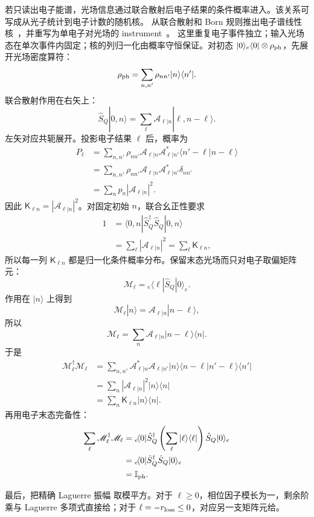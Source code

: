 \begin{exbox}
若只读出电子能谱，光场信息通过联合散射后电子结果的条件概率进入。该关系可写成从光子统计到电子计数的随机核。 从联合散射和 Born 规则推出电子谱线性核~，并重写为单电子对光场的 instrument~。 这里重复电子事件独立；输入光场态在单次事件内固定；核的列归一化由概率守恒保证。对初态 $|0\rangle_e\langle0|\otimes\rho_{\rm ph}$，先展开光场密度算符：
\[
\rho_{\rm ph}=\sum_{n,n'}\rho_{nn'}|n\rangle\langle n'|.
\]
联合散射作用在右矢上：
\[
\hat S_Q|0,n\rangle
=\sum_\ell\mathcal A_{\ell|n}|\ell,n-\ell\rangle.
\]
左矢对应共轭展开。投影电子结果 $\ell$ 后，概率为
\begin{align*}
P_\ell
&=\sum_{n,n'}\rho_{nn'}
\mathcal A_{\ell|n}\mathcal A_{\ell|n'}^*
\langle n'-\ell|n-\ell\rangle\\
&=\sum_{n,n'}\rho_{nn'}
\mathcal A_{\ell|n}\mathcal A_{\ell|n'}^*\delta_{nn'}\\
&=\sum_n p_n|\mathcal A_{\ell|n}|^2.
\end{align*}
因此 $\mathsf K_{\ell n}=|\mathcal A_{\ell|n}|^2$。对固定初始 $n$，联合幺正性要求
\begin{align*}
1
&=\langle0,n|\hat S_Q^\dagger\hat S_Q|0,n\rangle\\
&=\sum_\ell|\mathcal A_{\ell|n}|^2
=\sum_\ell\mathsf K_{\ell n},
\end{align*}
所以每一列 $\mathsf K_{\ell n}$ 都是归一化条件概率分布。保留末态光场而只对电子取偏矩阵元：
\[
\mathscr M_\ell
={}_e\!\langle\ell|\hat S_Q|0\rangle_e.
\]
作用在 $|n\rangle$ 上得到
\[
\mathscr M_\ell|n\rangle
=\mathcal A_{\ell|n}|n-\ell\rangle,
\]
所以
\[
\mathscr M_\ell
=\sum_n\mathcal A_{\ell|n}|n-\ell\rangle\langle n|.
\]
于是
\begin{align*}
\mathscr M_\ell^\dagger\mathscr M_\ell
&=\sum_{n,n'}
\mathcal A_{\ell|n}^*\mathcal A_{\ell|n'}
|n\rangle\langle n-\ell|n'-\ell\rangle\langle n'|\\
&=\sum_n|\mathcal A_{\ell|n}|^2|n\rangle\langle n|\\
&=\sum_n\mathsf K_{\ell n}|n\rangle\langle n|.
\end{align*}
再用电子末态完备性：
\begin{align*}
\sum_\ell\mathscr M_\ell^\dagger\mathscr M_\ell
&={}_e\!\langle0|\hat S_Q^\dagger
\left(\sum_\ell|\ell\rangle\langle\ell|\right)
\hat S_Q|0\rangle_e\\
&={}_e\!\langle0|\hat S_Q^\dagger\hat S_Q|0\rangle_e\\
&=\mathbb I_{\rm ph}.
\end{align*}

最后，把精确 Laguerre 振幅 取模平方。对于 $\ell\ge0$，相位因子模长为一，剩余阶乘与 Laguerre 多项式直接给；对于 $\ell=-r_{\rm loss}\le0$，对应另一支矩阵元给。
\end{exbox}

